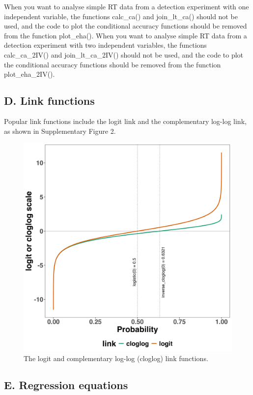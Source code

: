 \documentclass[
  man,floatsintext]{apa6}
\begin{document}
When you want to analyse simple RT data from a detection experiment with one independent variable, the functions calc\_ca() and join\_lt\_ca() should not be used, and the code to plot the conditional accuracy functions should be removed from the function plot\_eha().
When you want to analyse simple RT data from a detection experiment with two independent variables, the functions calc\_ca\_2IV() and join\_lt\_ca\_2IV() should not be used, and the code to plot the conditional accuracy functions should be removed from the function plot\_eha\_2IV().

\subsection{D. Link functions}\label{d.-link-functions}

Popular link functions include the logit link and the complementary log-log link, as shown in Supplementary Figure 2.



\begin{figure}[H]

{\centering \includegraphics[width=0.8\linewidth,height=0.67\textheight,]{../../Tutorial_2_Bayesian/figures/linkfunctions} 

}

\caption{The logit and complementary log-log (cloglog) link functions.}\label{fig:plot-link-functions}
\end{figure}

\subsection{E. Regression equations}\label{e.-regression-equations}
\end{document}
